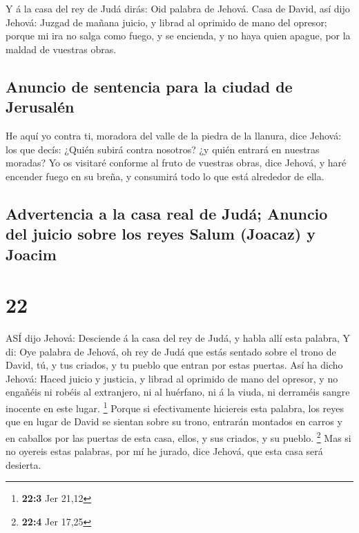  Y á la casa del rey de Judá dirás: Oid palabra de Jehová.
 Casa de David, así dijo Jehová: Juzgad de mañana juicio, y
librad al oprimido de mano del opresor; porque mi ira no salga como
fuego, y se encienda, y no haya quien apague, por la maldad de vuestras
obras.

\hypertarget{anuncio-de-sentencia-para-la-ciudad-de-jerusaluxe9n}{%
\subsection{Anuncio de sentencia para la ciudad de
Jerusalén}\label{anuncio-de-sentencia-para-la-ciudad-de-jerusaluxe9n}}

 He aquí yo contra ti, moradora del valle de la piedra de
la llanura, dice Jehová: los que decís: ¿Quién subirá contra nosotros?
¿y quién entrará en nuestras moradas?  Yo os visitaré
conforme al fruto de vuestras obras, dice Jehová, y haré encender fuego
en su breña, y consumirá todo lo que está alrededor de ella.

\hypertarget{advertencia-a-la-casa-real-de-juduxe1-anuncio-del-juicio-sobre-los-reyes-salum-joacaz-y-joacim}{%
\subsection{Advertencia a la casa real de Judá; Anuncio del juicio sobre
los reyes Salum (Joacaz) y
Joacim}\label{advertencia-a-la-casa-real-de-juduxe1-anuncio-del-juicio-sobre-los-reyes-salum-joacaz-y-joacim}}

\hypertarget{section-21}{%
\section{22}\label{section-21}}

 ASÍ dijo Jehová: Desciende á la casa del rey de Judá, y
habla allí esta palabra,  Y di: Oye palabra de Jehová, oh
rey de Judá que estás sentado sobre el trono de David, tú, y tus
criados, y tu pueblo que entran por estas puertas.  Así ha
dicho Jehová: Haced juicio y justicia, y librad al oprimido de mano del
opresor, y no engañéis ni robéis al extranjero, ni al huérfano, ni á la
viuda, ni derraméis sangre inocente en este lugar. \footnote{\textbf{22:3}
  Jer 21,12}  Porque si efectivamente hiciereis esta
palabra, los reyes que en lugar de David se sientan sobre su trono,
entrarán montados en carros y en caballos por las puertas de esta casa,
ellos, y sus criados, y su pueblo. \footnote{\textbf{22:4} Jer 17,25}
 Mas si no oyereis estas palabras, por mí he jurado, dice
Jehová, que esta casa será desierta.

